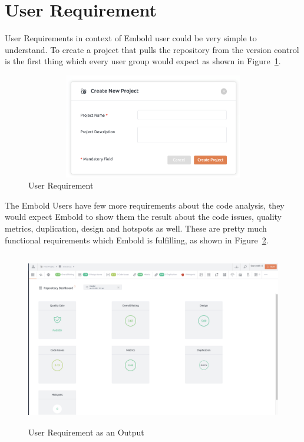 \section{User Requirement}
User Requirements in context of Embold user could be very simple to understand. To create a project that pulls the repository from the version control is the first thing which every user group would expect as shown in Figure~\ref{fig:Requirement}.\par
\begin{figure}[htbp]
\begin{center}
\includegraphics[width=4.5in, height=1.8in]{requirement.png}
\caption{User Requirement ~\cite{emboldio}}
\label{fig:Requirement}
\end{center}
\end{figure}
The Embold Users have few more requirements about the code analysis, they would expect Embold to show them the result about the code issues, quality metrics, duplication, design and hotspots as well. These are pretty much functional requirements which Embold is fulfilling, as shown in Figure~\ref{fig:Requirement1}. \par
\begin{figure}[htbp]
\begin{center}
\includegraphics[width=6.5 in, height=3in]{requirement1.png}
\caption{User Requirement as an Output ~\cite{emboldio}}
\label{fig:Requirement1}
\end{center}
\end{figure}
